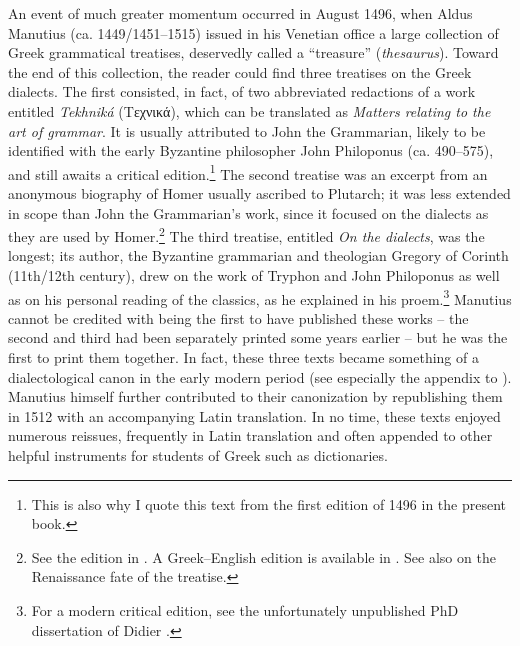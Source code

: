 An event of much greater momentum occurred in August 1496, when Aldus Manutius (ca. 1449/1451–1515) issued in his Venetian office a large collection of Greek grammatical treatises, deservedly called a “treasure” (\textit{thesaurus}). Toward the end of this collection, the reader could find three treatises on the Greek dialects. The first consisted, in fact, of two abbreviated redactions of a work entitled \textit{Tekhniká} (Tεχνικά), which can be translated as \textit{Matters relating to the art of grammar}. It is usually attributed to John the Grammarian, likely to be identified with the early Byzantine philosopher John Philoponus (ca. 490–575), and still awaits a critical edition.\footnote{This is also why I quote this text from the first edition of 1496 in the present book.} The second treatise was an excerpt from an anonymous biography of Homer usually ascribed to Plutarch; it was less extended in scope than John the Grammarian’s work, since it focused on the dialects as they are used by Homer.\footnote{See the edition in \citet{Kindstrand1990}. A Greek–English edition is available in \citet{Keaney1996}. See also \citet{VanRooy2018c} on the Renaissance fate of the treatise.} The third treatise, entitled \textit{On the dialects}, was the longest; its author, the Byzantine grammarian and theologian Gregory of Corinth (11th/12th century), drew on the work of Tryphon and John Philoponus as well as on his personal reading of the classics, as he explained in his proem.\footnote{For a modern critical edition, see the unfortunately unpublished PhD dissertation of Didier \citet{Xhardez1991}.} Manutius cannot be credited with being the first to have published these works – the second and third had been separately printed some years earlier – but he was the first to print them together. In fact, these three texts became something of a dialectological canon in the early modern period (see especially the appendix to \citealt{Trovato1984}). Manutius himself further contributed to their canonization by republishing them in 1512 with an accompanying Latin translation. In no time, these texts enjoyed numerous reissues, frequently in Latin translation and often appended to other helpful instruments for students of Greek such as dictionaries.

